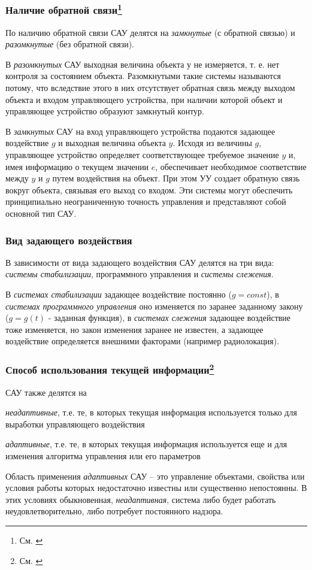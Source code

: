 \documentclass[../../TAU.tex]{subfiles}
\begin{document}
\subsubsection[Наличие обратной связи]{Наличие обратной связи\footnote{См. \cite[стр. 14]{kim:uch}}}
    По наличию обратной связи САУ делятся на {\it замкнутые} (с обратной связью) и {\it разомкнутые} (без обратной связи).\par
    В {\it разомкнутых} САУ выходная величина объекта у не измеряется, т. е. нет контроля за состоянием объекта. Разомкнутыми такие системы называются потому, что вследствие этого в них отсутствует обратная связь между выходом объекта и входом управляющего устройства, при наличии которой объект и управляющее устройство образуют замкнутый контур. \par
    В {\it замкнутых} САУ на вход управляющего устройства подаются задающее воздействие $g$ и выходная величина объекта $y$. Исходя из величины $g$, управляющее устройство определяет соответствующее требуемое значение $y$ и, имея информацию о текущем значении $e$, обеспечивает необходимое соответствие между $y$ и $g$ путем воздействия на объект. При этом УУ создает обратную связь вокруг объекта, связывая его выход со входом. Эти системы могут обеспечить принципиально неограниченную точность управления и представляют собой основной тип САУ. 

\subsubsection{Вид задающего воздействия}
    В зависимости от вида задающего воздействия САУ делятся на три вида: {\it системы стабилизации}, { программного управления} и {\it системы слежения}. \par
    В {\it системах стабилизации} задающее воздействие постоянно ($g = const$), в {\it системах программного управления} оно изменяется по заранее заданному закону ($g = g(t)$ - заданная функция), в {\it системах слежения} задающее воздействие тоже изменяется, но закон изменения заранее не известен, а задающее воздействие определяется внешними факторами (например радиолокация).

\pagebreak
\subsubsection[Способ использования текущей информации]{Способ использования текущей информации\footnote{См. \cite[стр. 19-20]{kim:uch}}}

    САУ также делятся на \par
    {\it неадаптивные}, т.е.  те, в которых текущая информация используется только для выработки управляющего воздействия \par
    {\it адаптивные}, т.е. те, в которых текущая информация используется еще и для изменения алгоритма управления или его параметров\\\par
    Область применения {\it адаптивных} САУ – это управление объектами, свойства или условия работы которых недостаточно известны или существенно непостоянны. В этих условиях обыкновенная, {\it неадаптивная}, система либо будет работать неудовлетворительно, либо потребует постоянного надзора. 
\end{document}
